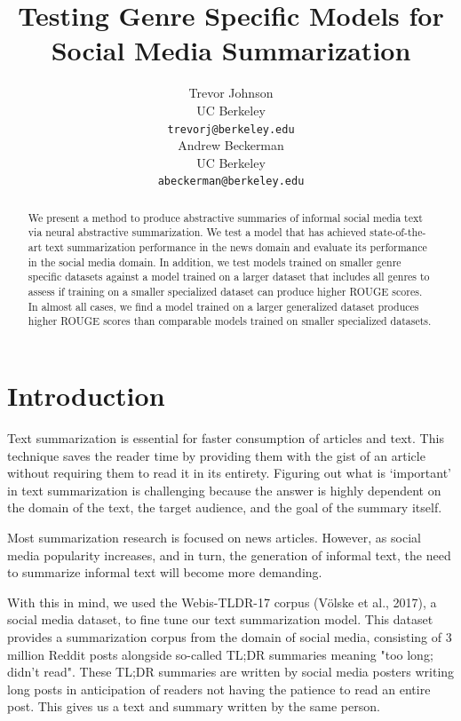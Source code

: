 \documentclass[11pt,a4paper, twocolumn]{article}
\title{Testing Genre Specific Models for Social Media Summarization}
\author{Trevor Johnson \\
  UC Berkeley  \\
  \texttt{trevorj@berkeley.edu} \\\And
  Andrew Beckerman \\
  UC Berkeley \\
  \texttt{abeckerman@berkeley.edu} \\}
\date{}
\begin{document}
\maketitle
\begin{abstract}

We present a method to produce abstractive summaries of informal social media text via neural abstractive summarization. We test a model that has achieved state-of-the-art text summarization performance in the news domain and evaluate its performance in the social media domain.
In addition, we test models trained on smaller genre specific datasets against a model trained on a larger dataset that includes all genres to assess if training on a smaller specialized dataset can produce higher ROUGE scores. In almost all cases, we find a model trained on a larger generalized dataset produces higher ROUGE scores than comparable models trained on smaller specialized datasets.

\end{abstract}

\section{Introduction}

Text summarization is essential for faster consumption of articles and text. This technique saves the reader time by providing them with the gist of an article without requiring them to read it in its entirety. Figuring out what is ‘important’ in text summarization is challenging because the answer is highly dependent on the domain of the text, the target audience, and the goal of the summary itself.

Most summarization research is focused on news articles. However, as social media popularity increases, and in turn, the generation of informal text, the need to summarize informal text will become more demanding.

With this in mind, we used the Webis-TLDR-17 corpus (Völske et al., 2017), a social media dataset, to fine tune our text summarization model. This dataset provides a summarization corpus from the domain of social media, consisting of 3 million Reddit posts alongside so-called TL;DR summaries meaning "too long; didn't read".  These TL;DR summaries are written by social media posters writing long posts in anticipation of readers not having the patience to read an entire post. This gives us a text and summary written by the same person.
\end{document}
